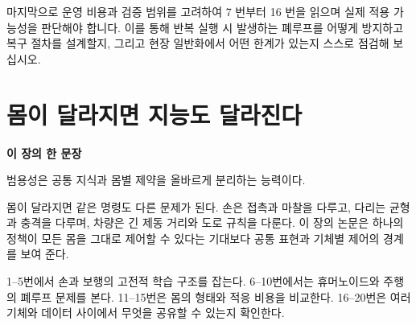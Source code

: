 \documentclass[11pt,openany]{book}
\newcommand{\chaptertakeaway}[1]{%
  \begin{tcolorbox}[
    breakable,
    colback=deepblue,
    colframe=deepblue,
    coltext=white,
    boxrule=0pt,
    arc=2mm,
    left=5mm,right=5mm,top=4mm,bottom=4mm
  ]
  {\sffamily\bfseries\large 이 장의 한 문장}\par\smallskip
  #1
  \end{tcolorbox}
}
\begin{document}
\begin{translationbox}[이 장을 덮기 전에]

마지막으로 운영 비용과 검증 범위를 고려하여 7 번부터 16 번을 읽으며 실제 적용 가능성을 판단해야 합니다. 이를 통해 반복 실행 시 발생하는 폐루프를 어떻게 방지하고 복구 절차를 설계할지, 그리고 현장 일반화에서 어떤 한계가 있는지 스스로 점검해 보십시오.

\end{translationbox}

\cleardoublepage

\chapter{몸이 달라지면 지능도 달라진다}

\chaptertakeaway{범용성은 공통 지식과 몸별 제약을 올바르게 분리하는 능력이다.}

몸이 달라지면 같은 명령도 다른 문제가 된다. 손은 접촉과 마찰을 다루고, 다리는 균형과 충격을 다루며, 차량은 긴 제동 거리와 도로 규칙을 다룬다. 이 장의 논문은 하나의 정책이 모든 몸을 그대로 제어할 수 있다는 기대보다 공통 표현과 기체별 제어의 경계를 보여 준다.

\begin{boardbox}[읽는 순서]

1--5번에서 손과 보행의 고전적 학습 구조를 잡는다. 6--10번에서는 휴머노이드와 주행의 폐루프 문제를 본다. 11--15번은 몸의 형태와 적응 비용을 비교한다. 16--20번은 여러 기체와 데이터 사이에서 무엇을 공유할 수 있는지 확인한다.

\end{boardbox}
\end{document}
